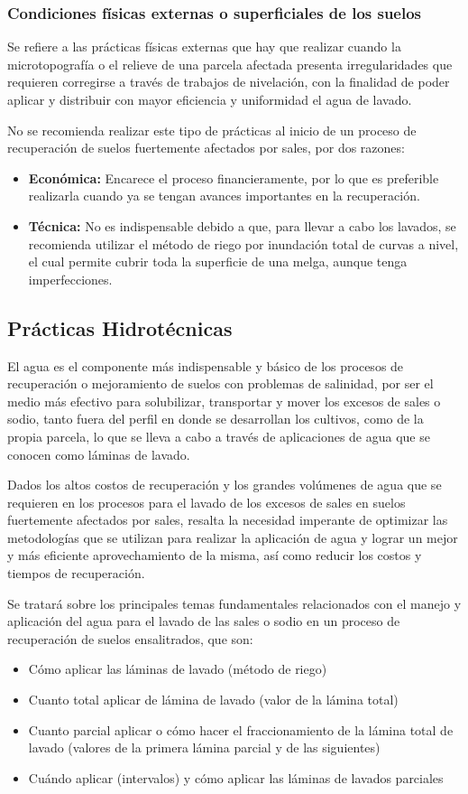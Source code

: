 \subsubsection{Condiciones físicas externas o superficiales de los suelos} 
Se refiere a las prácticas físicas externas que hay que realizar cuando la microtopografía o el relieve de una parcela afectada presenta irregularidades que requieren corregirse a través de trabajos de nivelación, con la finalidad de poder aplicar y distribuir con mayor eficiencia y uniformidad el agua de lavado.

No se recomienda realizar este tipo de prácticas al inicio de un proceso de recuperación de suelos fuertemente afectados por sales, por dos razones:
\begin{itemize}
    \item \textbf{Económica:} Encarece el proceso financieramente, por lo que es preferible realizarla cuando ya se tengan avances importantes en la recuperación.
    \item \textbf{Técnica:} No es indispensable debido a que, para llevar a cabo los lavados, se recomienda utilizar el método de riego por inundación total de curvas a nivel, el cual permite cubrir toda la superficie de una melga, aunque tenga imperfecciones.
\end{itemize}
\subsection{Prácticas Hidrotécnicas}
El agua es el componente más indispensable y básico de los procesos de recuperación o mejoramiento de suelos con problemas de salinidad, por ser el medio más efectivo para solubilizar, transportar y mover los excesos de sales o sodio, tanto fuera del perfil en donde se desarrollan los cultivos, como de la propia parcela, lo que se lleva a cabo a través de aplicaciones de agua que se conocen como láminas de lavado.

Dados los altos costos de recuperación y los grandes volúmenes de agua que se requieren en los procesos para el lavado de los excesos de sales en suelos fuertemente afectados por sales, resalta la necesidad imperante de optimizar las metodologías que se utilizan para realizar la aplicación de agua y lograr un mejor y más eficiente aprovechamiento de la misma, así como reducir los costos y tiempos de recuperación.

Se tratará sobre los principales temas fundamentales relacionados con el manejo y
aplicación del agua para el lavado de las sales o sodio en un proceso de
recuperación de suelos ensalitrados, que son:
\begin{itemize}
    \item Cómo aplicar las láminas de lavado (método de riego)
    \item Cuanto total aplicar de lámina de lavado (valor de la lámina total)
    \item Cuanto parcial aplicar o cómo hacer el fraccionamiento de la lámina total de lavado (valores de la primera lámina parcial y de las siguientes)
    \item Cuándo aplicar (intervalos) y cómo aplicar las láminas de lavados parciales
\end{itemize}

